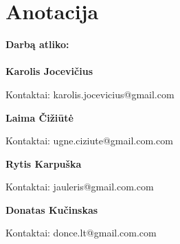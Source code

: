 

\newcommand{\anotacijaIndelis}[3]{
	\textbf{#1}
	\begin{flushleft}
	\hspace*{1cm}
	Kontaktai: #2
	\\
	\hspace*{1cm}
	Indėlis: #3
	\end{flushleft}
}

\newcommand{\anotacija}[2]{
	\textbf{#1}
	\begin{flushleft}
	\hspace*{1cm}
	Kontaktai: #2
	\end{flushleft}
}

\section*{Anotacija}
	
		\textbf{Darbą atliko:}\\\\
		\anotacija{Karolis Jocevičius}{karolis.jocevicius@gmail.com}
		\anotacija{Laima Čižiūtė}{ugne.ciziute@gmail.com.com}
		\anotacija{Rytis Karpuška}{jauleris@gmail.com.com}
		\anotacija{Donatas Kučinskas}{donce.lt@gmail.com.com}